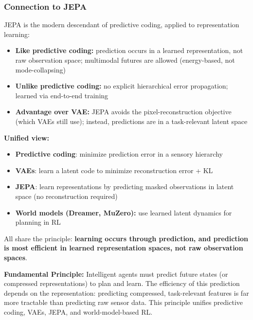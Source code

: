 \subsubsection{Connection to JEPA}

JEPA is the modern descendant of predictive coding, applied to representation learning:

\begin{itemize}
    \item \textbf{Like predictive coding:} prediction occurs in a learned representation, not raw observation space; multimodal futures are allowed (energy-based, not mode-collapsing)
    \item \textbf{Unlike predictive coding:} no explicit hierarchical error propagation; learned via end-to-end training
    \item \textbf{Advantage over VAE:} JEPA avoids the pixel-reconstruction objective (which VAEs still use); instead, predictions are in a task-relevant latent space
\end{itemize}

\textbf{Unified view:}

\begin{itemize}
    \item \textbf{Predictive coding}: minimize prediction error in a sensory hierarchy
    \item \textbf{VAEs}: learn a latent code to minimize reconstruction error + KL
    \item \textbf{JEPA}: learn representations by predicting masked observations in latent space (no reconstruction required)
    \item \textbf{World models (Dreamer, MuZero):} use learned latent dynamics for planning in RL
\end{itemize}

All share the principle: \textbf{learning occurs through prediction, and prediction is most efficient in learned representation spaces, not raw observation spaces}.

\begin{notebox}
    \textbf{Fundamental Principle:} Intelligent agents must predict future states (or compressed representations) to plan and learn. The efficiency of this prediction depends on the representation: predicting compressed, task-relevant features is far more tractable than predicting raw sensor data. This principle unifies predictive coding, VAEs, JEPA, and world-model-based RL.
\end{notebox}

